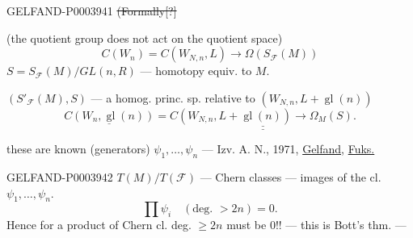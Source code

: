 \begin{GelfandAdjacentEvidence}{GELFAND-P000394}{1}
\sout{(Formally[?]}
\end{GelfandAdjacentEvidence}


(the quotient group does not act on the quotient space)
\begin{equation*}
C (W_n)=C (W_{N, n}, L)\longrightarrow\Omega (S_{\mathcal{F}}(M))
\end{equation*}
$S=S_{\mathcal{F}}(M)/GL (n, R)$ --- homotopy equiv. to $M$.

$(S'_{\mathcal{F}}(M), S)$ --- a homog. princ. sp. relative to
$(W_{N, n}, L+\operatorname{gl}(n))$
\begin{equation*}
\underline{C (W_n,\operatorname{gl}(n))}
=\underline{\underline{C (W_{N, n}, L+\operatorname{gl}(n))\longrightarrow\Omega_M (S).}}
\end{equation*}

these are known (generators) $\psi_1,\dots,\psi_n$ ---
Izv. A. N., 1971, \underline{Gelfand,} \underline{Fuks.}

\begin{GelfandAdjacentEvidence}{GELFAND-P000394}{2}
$T (M)/T (\mathcal{F})$ --- Chern classes --- images of the cl. $\psi_1,\dots,\psi_n$.
\begin{equation*}
\prod\psi_i\quad (\text{deg. }>2n)=0.
\end{equation*}
Hence for
a product of Chern cl.
deg. $\geq2n$ must be $0$!! --- this is Bott's thm. ---
\end{GelfandAdjacentEvidence}


